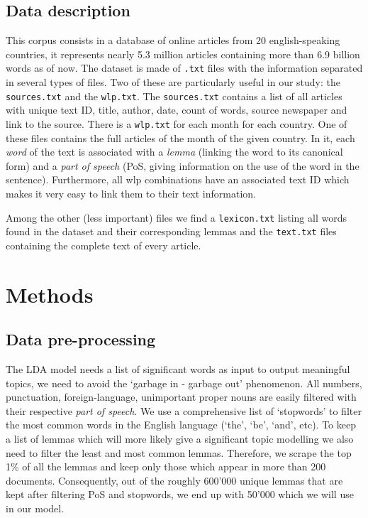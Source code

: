 \documentclass[11pt]{article}
\newcommand{\code}[1]{\texttt{#1}}
\begin{document}
\subsection{Data description}
This corpus consists in a database of online articles from 20 english-speaking countries, it represents nearly 5.3 million articles containing more than 6.9 billion words as of now. The dataset is made of \code{.txt} files with the information separated in several types of files.
Two of these are particularly useful in our study: the \code{sources.txt} and the \code{wlp.txt}.
The \code{sources.txt} contains a list of all articles with unique text ID, title, author, date, count of words, source newspaper and link to the source.
There is a \code{wlp.txt} for each month for each country. One of these files contains the full articles of the month of the given country. In it, each \textit{word} of the text is associated with a \textit{lemma} (linking the word to its canonical form) and a \textit{part of speech} (PoS, giving information on the use of the word in the sentence). Furthermore, all wlp combinations have an associated text ID which makes it very easy to link them to their text information.

Among the other (less important) files we find a \code{lexicon.txt} listing all words found in the dataset and their corresponding lemmas and the \code{text.txt} files containing the complete text of every article.

\section{Methods}

\subsection{Data pre-processing}
The LDA model needs a list of significant words as input to output meaningful topics, we need to avoid the `garbage in - garbage out' phenomenon.
All numbers, punctuation, foreign-language, unimportant proper nouns are easily filtered with their respective \textit{part of speech}.
We use a comprehensive list of `stopwords' to filter the most common words in the English language (`the', `be', `and', etc).
To keep a list of lemmas which will more likely give a significant topic modelling we also need to filter the least and most common lemmas. Therefore, we scrape the top 1\% of all the lemmas and keep only those which appear in more than 200 documents. Consequently, out of the roughly 600'000 unique lemmas that are kept after filtering PoS and stopwords, we end up with 50'000 which we will use in our model.
\end{document}
